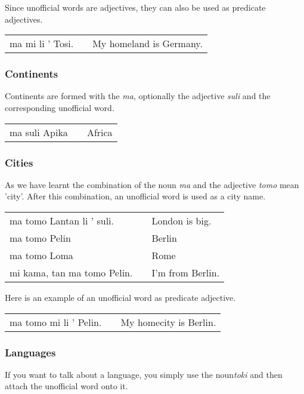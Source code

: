 Since unofficial words are adjectives, they can also be used as predicate adjectives.

\begin{supertabular}{p{5,5cm}|ll}
ma mi li ' Tosi. && My homeland is Germany.  \\
\end{supertabular}

%
\subsubsection*{Continents}
%
Continents are formed with the \textit{ma}, optionally the adjective \textit{suli} and the corresponding unofficial word. 

\begin{supertabular}{p{2,5cm}|ll}
ma suli Apika && Africa \\
\end{supertabular}

%
\subsubsection*{Cities}
%
As we have learnt the combination of the noun \textit{ma} and the adjective \textit{tomo} mean 'city'.
After this combination, an unofficial word is used as a city name. 

\begin{supertabular}{p{5,5cm}|ll}
ma tomo Lantan li ' suli. && London is big. \\
ma tomo Pelin && Berlin \\
ma tomo Loma && Rome \\
mi kama, tan ma tomo Pelin. && I'm from Berlin. \\
\end{supertabular} 

Here is an example of an unofficial word as predicate adjective.

\begin{supertabular}{p{5,5cm}|ll}
ma tomo mi li ' Pelin. && My homecity is Berlin.  \\
\end{supertabular}

%
\subsubsection*{Languages}
%
If you want to talk about a language, you simply use the noun\textit{toki} and then attach the unofficial word onto it. 

